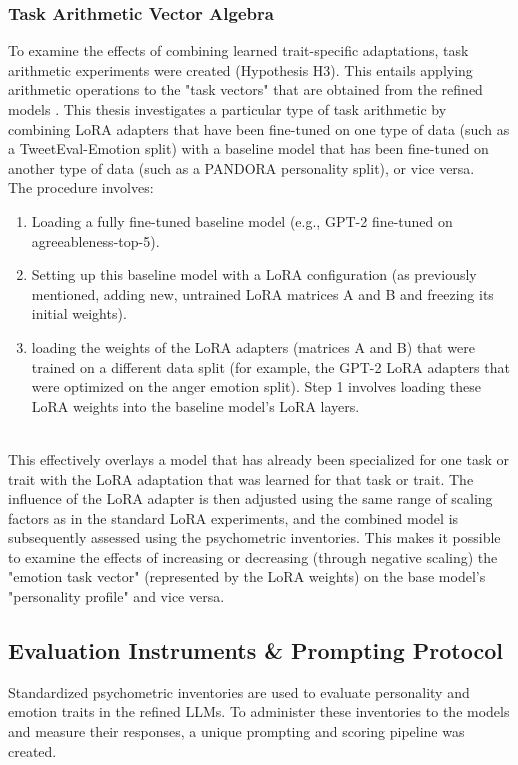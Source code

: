 \documentclass{DESSThesis}
\begin{document}
\subsubsection{Task Arithmetic Vector Algebra}
To examine the effects of combining learned trait-specific adaptations, task arithmetic experiments were created (Hypothesis H3). This entails applying arithmetic operations to the "task vectors" that are obtained from the refined models \cite{ilharco_editing_2023}. This thesis investigates a particular type of task arithmetic by combining LoRA adapters that have been fine-tuned on one type of data (such as a TweetEval-Emotion split) with a baseline model that has been fine-tuned on another type of data (such as a PANDORA personality split), or vice versa.
\\
The procedure involves:
\begin{enumerate}
    \item Loading a fully fine-tuned baseline model (e.g., GPT-2 fine-tuned on agreeableness-top-5).
\item Setting up this baseline model with a LoRA configuration (as previously mentioned, adding new, untrained LoRA matrices A and B and freezing its initial weights).
\item loading the weights of the LoRA adapters (matrices A and B) that were trained on a different data split (for example, the GPT-2 LoRA adapters that were optimized on the anger emotion split). Step 1 involves loading these LoRA weights into the baseline model's LoRA layers.
\end{enumerate}
\\
This effectively overlays a model that has already been specialized for one task or trait with the LoRA adaptation that was learned for that task or trait. The influence of the LoRA adapter is then adjusted using the same range of scaling factors as in the standard LoRA experiments, and the combined model is subsequently assessed using the psychometric inventories. This makes it possible to examine the effects of increasing or decreasing (through negative scaling) the "emotion task vector" (represented by the LoRA weights) on the base model's "personality profile" and vice versa.

\subsection{Evaluation Instruments \& Prompting Protocol}
Standardized psychometric inventories are used to evaluate personality and emotion traits in the refined LLMs. To administer these inventories to the models and measure their responses, a unique prompting and scoring pipeline was created.
\end{document}
